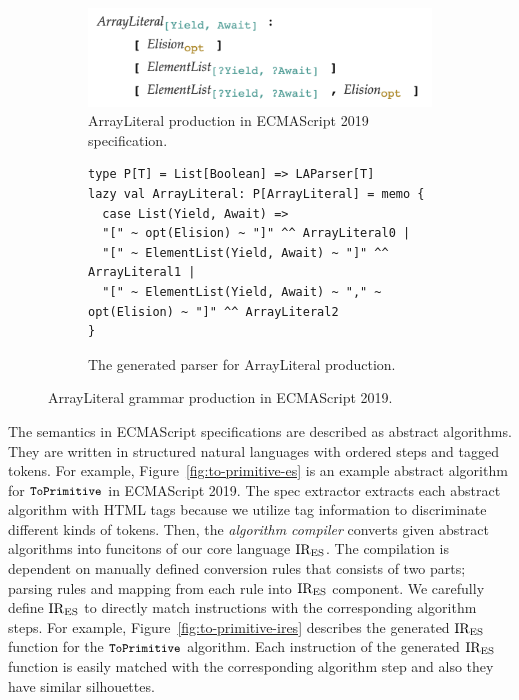 \begin{figure}
  \centering
  \begin{subfigure}[t]{0.4\textwidth}
    \includegraphics[width=\textwidth]{img/array_literal.png}
    \caption{ArrayLiteral production in ECMAScript 2019 specification.}
    \label{fig:array-literal-es}
  \end{subfigure}
  \begin{subfigure}[t]{0.5\textwidth}
    \begin{lstlisting}[style=myScalastyle]
type P[T] = List[Boolean] => LAParser[T]
lazy val ArrayLiteral: P[ArrayLiteral] = memo {
  case List(Yield, Await) =>
  "[" ~ opt(Elision) ~ "]" ^^ ArrayLiteral0 |
  "[" ~ ElementList(Yield, Await) ~ "]" ^^ ArrayLiteral1 |
  "[" ~ ElementList(Yield, Await) ~ "," ~ opt(Elision) ~ "]" ^^ ArrayLiteral2
}
    \end{lstlisting}
    \caption{The generated parser for ArrayLiteral production.}
    \label{fig:array-literal-parser}
  \end{subfigure}
  \caption{ArrayLiteral grammar production in ECMAScript 2019.}
  \label{fig:array-literal}
\end{figure}

The semantics in ECMAScript specifications are described as
abstract algorithms. They are written in structured natural languages
with ordered steps and tagged tokens. For example, Figure~\ref{fig:to-primitive-es}
is an example abstract algorithm for \( \texttt{\small ToPrimitive} \) in
ECMAScript 2019. The spec extractor extracts each abstract algorithm
with HTML tags because we utilize tag information to discriminate
different kinds of tokens. Then, the \textit{algorithm compiler} converts
given abstract algorithms into funcitons of our core language \( \text{IR}_\text{ES} \).
The compilation is dependent on manually defined conversion rules
that consists of two parts; parsing rules and mapping from each rule into \( \text{IR}_\text{ES} \)
component. We carefully define \( \text{IR}_\text{ES} \) to directly match instructions with
the corresponding algorithm steps. For example, Figure~\ref{fig:to-primitive-ires}
describes the generated \( \text{IR}_\text{ES} \) function for the \( \texttt{\small ToPrimitive} \)
algorithm. Each instruction of the generated \( \text{IR}_\text{ES} \) function
is easily matched with the corresponding algorithm step
and also they have similar silhouettes.

